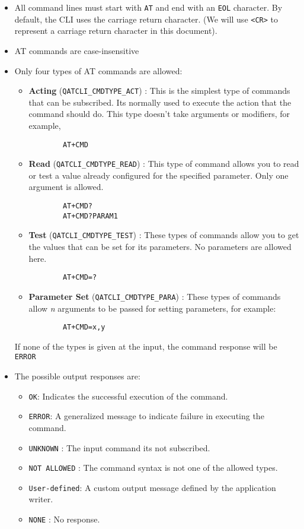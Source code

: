 \begin{itemize}
    \item All command lines must start with \lstinline{AT} and end with an \lstinline{EOL} character. By default, the CLI uses the carriage return character. (We will use \lstinline{<CR>} to represent a carriage return character in this document).
    \item AT commands are case-insensitive 
    \item Only four types of AT commands are allowed:
    \begin{itemize}
        \item \textbf{Acting} (\lstinline{QATCLI_CMDTYPE_ACT}) : This is the simplest type of commands that can be subscribed. Its normally used to execute the action that the command should do. This type doesn't take arguments or modifiers, for example,
        \begin{lstlisting}
        AT+CMD
        \end{lstlisting}
        \item \textbf{Read} (\lstinline{QATCLI_CMDTYPE_READ}) : This type of command allows you to read or test a value already configured for the specified parameter. Only one argument is allowed.
        \begin{lstlisting}
        AT+CMD?
        AT+CMD?PARAM1
        \end{lstlisting}        
        \item \textbf{Test} (\lstinline{QATCLI_CMDTYPE_TEST}) : These types of commands allow you to get the values that can be set for its parameters. No parameters are allowed here.
        \begin{lstlisting}
        AT+CMD=?
        \end{lstlisting}
        \item \textbf{Parameter Set} (\lstinline{QATCLI_CMDTYPE_PARA}) : These types of commands allow \textit{n} arguments to be passed for setting parameters, for example:
        \begin{lstlisting}
        AT+CMD=x,y
        \end{lstlisting}
    \end{itemize}
    If none of the types is given at the input, the command response will be \lstinline{ERROR}
    \item The possible output responses are:
    \begin{itemize}
        \item \lstinline{OK}: Indicates the successful execution of the command.
        \item \lstinline{ERROR}: A generalized message to indicate failure in executing the command. 
        \item \lstinline{UNKNOWN} : The input command its not subscribed.
        \item \lstinline{NOT ALLOWED} : The command syntax is not one of the allowed types.
        \item \lstinline{User-defined}: A custom output message defined by the application writer.
        \item \lstinline{NONE} : No response.
    \end{itemize}
\end{itemize}


